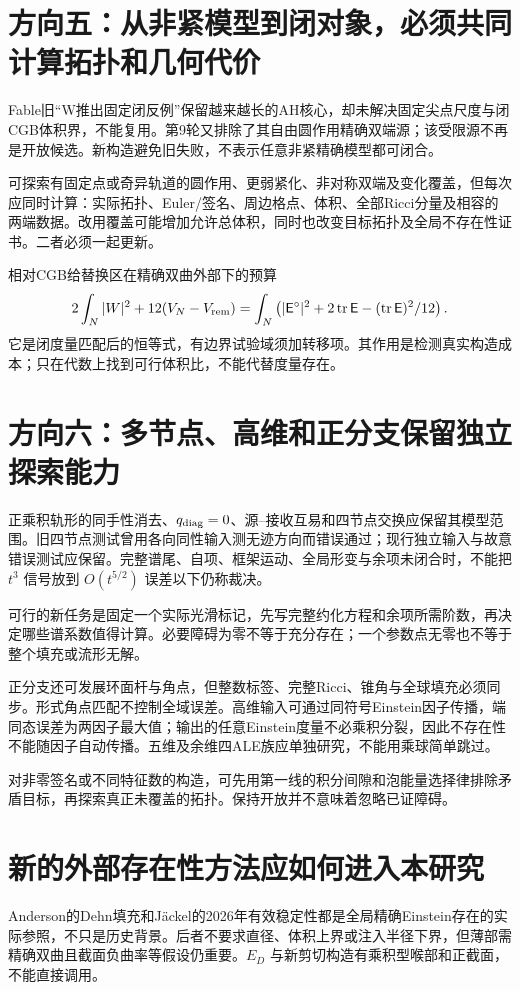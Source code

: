 \documentclass[UTF8,fontset=fandol,zihao=-4]{ctexart}
\theoremstyle{research}
\DeclareMathOperator{\tr}{tr}\DeclareMathOperator{\Id}{Id}\DeclareMathOperator{\diver}{div}
\begin{document}
\section{方向五：从非紧模型到闭对象，必须共同计算拓扑和几何代价}
Fable旧“W推出固定闭反例”保留越来越长的AH核心，却未解决固定尖点尺度与闭CGB体积界，不能复用\cite{Fable}。第9轮又排除了其自由圆作用精确双端源；该受限源不再是开放候选。新构造避免旧失败，不表示任意非紧精确模型都可闭合。

可探索有固定点或奇异轨道的圆作用、更弱紧化、非对称双端及变化覆盖，但每次应同时计算：实际拓扑、Euler/签名、周边格点、体积、全部Ricci分量及相容的两端数据。改用覆盖可能增加允许总体积，同时也改变目标拓扑及全局不存在性证书。二者必须一起更新。

相对CGB给替换区在精确双曲外部下的预算
\[
 2\int_N|W|^2+12(V_N-V_{\rm rem})
 =\int_N\left(|\mathsf E^\circ|^2+2\tr\mathsf E-
                       (\tr\mathsf E)^2/12\right).
\]
它是闭度量匹配后的恒等式，有边界试验域须加转移项。其作用是检测真实构造成本；只在代数上找到可行体积比，不能代替度量存在。

\section{方向六：多节点、高维和正分支保留独立探索能力}
正乘积轨形的同手性消去、$q_{\rm diag}=0$、源--接收互易和四节点交换应保留其模型范围。旧四节点测试曾用各向同性输入测无迹方向而错误通过；现行独立输入与故意错误测试应保留。完整谱尾、自项、框架运动、全局形变与余项未闭合时，不能把 $t^3$ 信号放到 $O(t^{5/2})$ 误差以下仍称裁决。

可行的新任务是固定一个实际光滑标记，先写完整约化方程和余项所需阶数，再决定哪些谱系数值得计算。必要障碍为零不等于充分存在；一个参数点无零也不等于整个填充或流形无解。

正分支还可发展环面杆与角点，但整数标签、完整Ricci、锥角与全球填充必须同步。形式角点匹配不控制全域误差。高维输入可通过同符号Einstein因子传播，端同态误差为两因子最大值；输出的任意Einstein度量不必乘积分裂，因此不存在性不能随因子自动传播。五维及余维四ALE族应单独研究，不能用乘球简单跳过。

对非零签名或不同特征数的构造，可先用第一线的积分间隙和泡能量选择律排除矛盾目标，再探索真正未覆盖的拓扑。保持开放并不意味着忽略已证障碍。

\section{新的外部存在性方法应如何进入本研究}
Anderson的Dehn填充\cite{Anderson}和Jäckel的2026年有效稳定性\cite{Jackel}都是全局精确Einstein存在的实际参照，不只是历史背景。后者不要求直径、体积上界或注入半径下界，但薄部需精确双曲且截面负曲率等假设仍重要。$E_D$ 与新剪切构造有乘积型喉部和正截面，不能直接调用。
\end{document}
